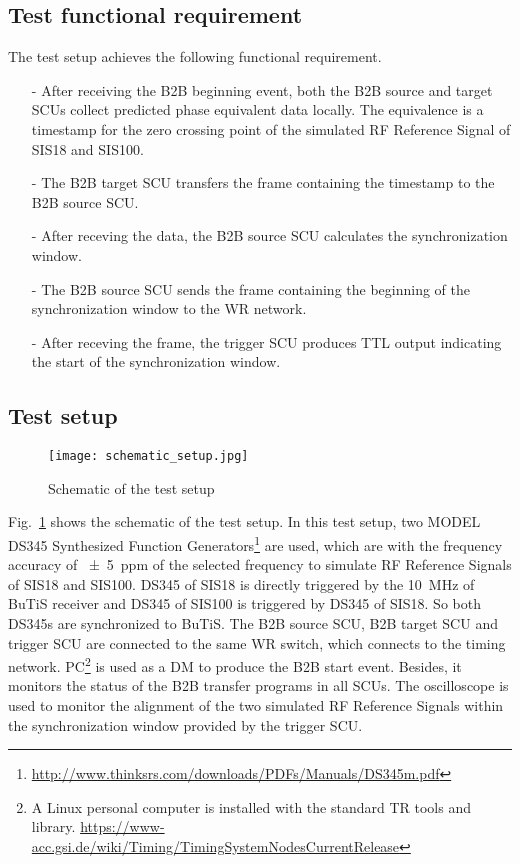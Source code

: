 \subsection{Test functional requirement}
The test setup achieves the following functional requirement.
\begin{itemize}
\item[-] After receiving the B2B beginning event, both the B2B source and target SCUs collect predicted phase equivalent data locally. The equivalence is a timestamp for the zero crossing point of the simulated RF Reference Signal of SIS18 and SIS100. 
\item[-] The B2B target SCU transfers the frame containing the timestamp to the B2B source SCU.
\item[-] After receving the data, the B2B source SCU calculates the synchronization window.
\item[-] The B2B source SCU sends the frame containing the beginning of the synchronization window to the WR network.
\item[-] After receving the frame, the trigger SCU produces TTL output indicating the start of the synchronization window. 
\end{itemize}

\subsection{Test setup}

\begin{figure}[H]
   \centering   
   \texttt{[image: schematic\_setup.jpg]}
   \caption{Schematic of the test setup}
   \label{setup}
\end{figure}

Fig.~\ref{setup} shows the schematic of the test setup. In this test setup, two MODEL DS345 Synthesized Function Generators\footnote{\url{http://www.thinksrs.com/downloads/PDFs/Manuals/DS345m.pdf}} are used, which are with the frequency accuracy of \SI{+-5}{ppm} of the selected frequency to simulate RF Reference Signals of SIS18 and SIS100. DS345 of SIS18 is directly triggered by the \SI{10}{\MHz} of \gls{BuTiS} receiver and DS345 of SIS100 is triggered by DS345 of SIS18. So both DS345s are synchronized to BuTiS. The B2B source SCU, B2B target SCU and trigger SCU are connected to the same WR switch, which connects to the timing network. \gls{PC}\footnote{A Linux personal computer is installed with the standard TR tools and library. \newline\url{https://www-acc.gsi.de/wiki/Timing/TimingSystemNodesCurrentRelease}} is used as a DM to produce the B2B start event. Besides, it monitors the status of the  B2B transfer programs in all SCUs. The oscilloscope is used to monitor the alignment of the two simulated RF Reference Signals within the synchronization window provided by the trigger SCU.   

